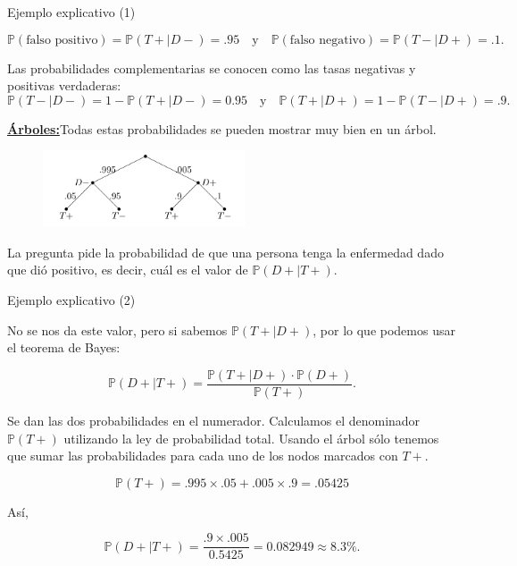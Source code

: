 \documentclass[10pt]{beamer}
\begin{document}
\begin{frame}{Ejemplo explicativo (1)}
\small{	
\[
\mathbb{P}(\text{falso positivo}) = \mathbb{P}(T+|D-) = .95\quad \text{y}\quad \mathbb{P}(\text{falso negativo}) = \mathbb{P}(T-|D+) = .1.
\]
		
Las probabilidades complementarias se conocen como las  tasas negativas y  positivas verdaderas:
\[
\mathbb{P}(T-|D-) = 1 - \mathbb{P}(T+|D-) = 0.95 \quad \text{y}\quad   \mathbb{P}(T+|D+) = 1 - \mathbb{P}(T-|D+) = .9.
\]	
}
\underline{\textbf{\'Arboles:}}Todas estas probabilidades se pueden mostrar muy bien en un \'arbol.

\begin{figure}[h]
	\centering
	\includegraphics[width=6cm]{g7}
\end{figure}
La pregunta pide la probabilidad de que una persona tenga la enfermedad dado que  di\'o positivo, es decir, cu\'al es el valor de $\mathbb{P}(D+ | T +)$.
\end{frame}
\begin{frame}{Ejemplo explicativo (2)}
\small{ No se nos da este valor, pero si sabemos $\mathbb{P}(T+|D +)$, por lo que podemos usar el teorema de Bayes:

\[
\mathbb{P}(D+|T +) = \frac{\mathbb{P}(T+|D +)\cdot \mathbb{P}(D+ )}{\mathbb{P}(T+)}.
\]

Se dan las dos probabilidades en el numerador. Calculamos el denominador $\mathbb{P}(T +)$ utilizando la ley de probabilidad total. Usando el \'arbol s\'olo tenemos que sumar las probabilidades para cada uno de los nodos marcados con $T+$.

\[
\mathbb{P}(T +) = .995 \times .05 + .005 \times  .9 = .05425
\]

As\'i,

\[
\mathbb{P}(D+|T +) = \frac{.9 \times .005}{0.5425} = 0.082949 \approx 8.3\%.
\]	
}
\end{frame}
\end{document}
